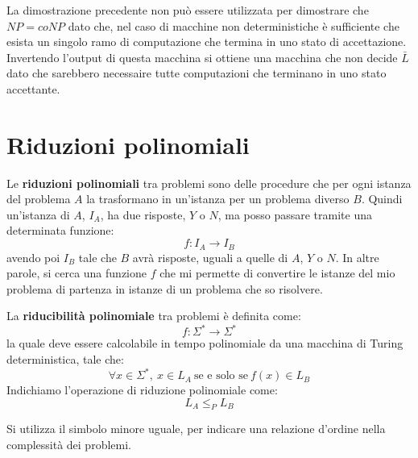 La dimostrazione precedente non può essere utilizzata per dimostrare che $NP = coNP$ dato che, nel caso di macchine non deterministiche è sufficiente che esista un singolo ramo di computazione che termina in uno stato di accettazione. Invertendo l'output di questa macchina si ottiene una macchina che non decide $\bar{L}$ dato che sarebbero necessaire tutte computazioni che terminano in uno stato accettante.
\section{Riduzioni polinomiali}
Le \textbf{riduzioni polinomiali} tra problemi sono delle procedure che per ogni istanza del problema $A$ la trasformano in un'istanza per un problema diverso $B$. Quindi un'istanza di $A$, $I_A$, ha due risposte, $Y$ o $N$, ma posso passare tramite una determinata funzione:
\begin{equation}
    f: I_A \to I_B
\end{equation}
avendo poi $I_B$ tale che $B$ avrà risposte, uguali a quelle di $A$, $Y$ o $N$. In altre parole, si cerca una funzione $f$ che mi permette di convertire le istanze del mio problema di partenza in istanze di un problema che so risolvere.

\begin{definizione}
    La \textbf{riducibilità polinomiale} tra problemi è definita come: 
    \begin{equation}
        f: \Sigma^{\ast} \to \Sigma^{\ast}
    \end{equation}
    la quale deve essere calcolabile in tempo polinomiale da una macchina di Turing deterministica, tale che: 
    \begin{equation}
        \forall x \in \Sigma^{\ast}, \ x \in L_A \ \text{se e solo se} \ f(x) \in L_B
    \end{equation}
    Indichiamo l'operazione di riduzione polinomiale come: 
    \begin{equation}
        L_A \leq_P L_B
    \end{equation}
\end{definizione}
\begin{osservazione}
    Si utilizza il simbolo minore uguale, per indicare una relazione d'ordine nella complessità dei problemi.
\end{osservazione}

